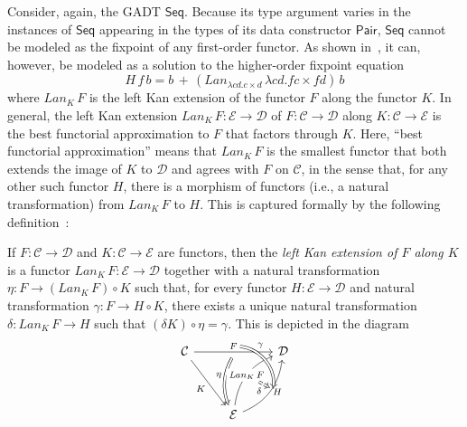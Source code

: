 \documentclass[acmsmall,screen,review,anonymous]{acmart}
\theoremstyle{definition}
\newcommand{\cal}{\mathcal}
\begin{document}
Consider, again, the GADT $\mathsf{Seq}$. Because its type argument
varies in the instances of $\mathsf{Seq}$ appearing in the types of
its data constructor $\mathsf{Pair}$, $\mathsf{Seq}$ cannot be
modeled as the fixpoint of any first-order functor. As shown
in~\cite{jp19}, it can, however, be modeled as a solution to the
higher-order fixpoint equation
\[H\,f\,b = b \,+\,(Lan_{\lambda c d. c \times d}\, \lambda
c d. f c \times f d)\,b\] where $Lan_K \,F$ is the left Kan extension
of the functor $F$ along the functor $K$. In general, the left Kan
extension $Lan_K \,F : {\cal E} \to {\cal D}$ of $F : {\cal C} \to
{\cal D}$ along $K : {\cal C} \to {\cal E}$ is the best functorial
approximation to $F$ that factors through $K$. Here, ``best functorial
approximation'' means that $Lan_K \,F$ is the smallest functor that
both extends the image of $K$ to $\cal D$ and agrees with $F$ on $\cal
C$, in the sense that, for any other such functor $H$, there is a
morphism of functors (i.e., a natural transformation) from $Lan_K \,F$
to $H$. This is captured formally by the following
definition~\cite{mac71}:
\begin{definition}\label{def:lke}
If $F : {\cal C} \to {\cal D}$ and $K : {\cal C} \to {\cal E}$ are
functors, then the {\em left Kan extension of $F$ along $K$} is a
functor $\mathit{Lan}_K\,F : {\cal E} \to {\cal D}$ together with a
natural transformation $\eta : F \to (\mathit{Lan}_K\,F) \circ K$ such
that, for every functor $H : {\cal E} \to {\cal D}$ and natural
transformation $\gamma : F \to H \circ K$, there exists a unique
natural transformation $\delta : \mathit{Lan}_K\,F \to H$ such that
$(\delta K) \circ \eta = \gamma$. This is depicted in the diagram
\[\begin{tikzcd}[row sep = huge]
{\cal C}
\ar[rr, "{F}"{name=Fa, above}, ""{name=F, below}]
\ar[rd, "{K}"']
&& {\cal D} \\
& {\cal E}
\ar[Rightarrow, bend right = 25, from=F, "{\eta}"']
\ar[ur, bend left, "{\mathit{Lan}_{K}\,F}"{name=Lan, description}]
\ar[ur, bend right, "{H}"'{name=L, right}, ""'{name=Lr, right}]
\ar[Rightarrow, bend left = 45, from=Fa, to=Lr, "{\gamma}" near start]
\ar[Rightarrow, dashed, from=Lan, to=L, "{\delta}"']
\end{tikzcd}\]
\end{definition}
\end{document}
